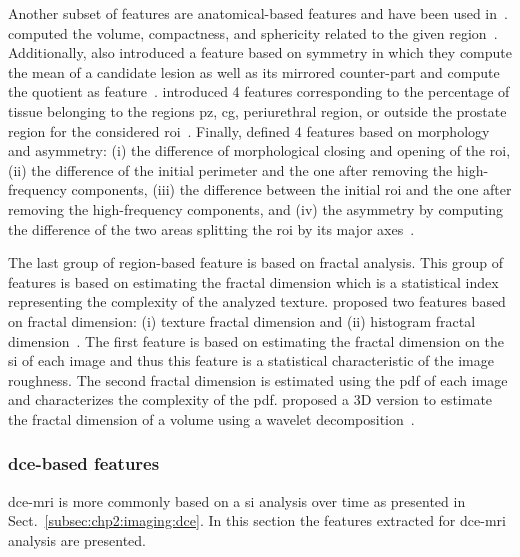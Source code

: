 Another subset of features are anatomical-based features and have been used in~\cite{Litjens2012,Litjens2014,Matulewicz2013,cameron2014multiparametric,cameron2016maps}.
\citeauthor{Litjens2012} computed the volume, compactness, and sphericity related to the given region~\cite{Litjens2012, Litjens2014}.
Additionally, \citeauthor{Litjens2014} also introduced a feature based on symmetry in which they compute the mean of a candidate lesion as well as its mirrored counter-part and compute the quotient as feature~\cite{Litjens2014}.
\citeauthor{Matulewicz2013} introduced 4 features corresponding to the percentage of tissue belonging to the regions \ac{pz}, \ac{cg}, periurethral region, or outside the prostate region for the considered \ac{roi}~\cite{Matulewicz2013}.
Finally, \citeauthor{cameron2016maps} defined 4 features based on morphology and asymmetry:
(i) the difference of morphological closing and opening of the \ac{roi}, (ii) the difference of the initial perimeter and the one after removing the high-frequency components, (iii) the difference between the initial \ac{roi} and the one after removing the high-frequency components, and (iv) the asymmetry by computing the difference of the two areas splitting the \ac{roi} by its major axes~\cite{cameron2014multiparametric,cameron2016maps}.

The last group of region-based feature is based on fractal analysis.
This group of features is based on estimating the fractal dimension which is a statistical index representing the complexity of the analyzed texture.
\citeauthor{Lv2009} proposed two features based on fractal dimension: (i) texture fractal dimension and (ii) histogram fractal dimension~\cite{Lv2009}.
The first feature is based on estimating the fractal dimension on the \ac{si} of each image and thus this feature is a statistical characteristic of the image roughness.
The second fractal dimension is estimated using the \ac{pdf} of each image and characterizes the complexity of the \ac{pdf}.
\citeauthor{Lopes2011} proposed a 3D version to estimate the fractal dimension of a volume using a wavelet decomposition~\cite{Lopes2011}.

\subsubsection{\Ac{dce}-based features}\label{subsubsec:chp3:img-clas:CADX-fea-dec:DCE-fea}

\ac{dce}-\ac{mri} is more commonly based on a \ac{si} analysis over time as presented in Sect.~\ref{subsec:chp2:imaging:dce}.
In this section the features extracted for \ac{dce}-\ac{mri} analysis are presented.

